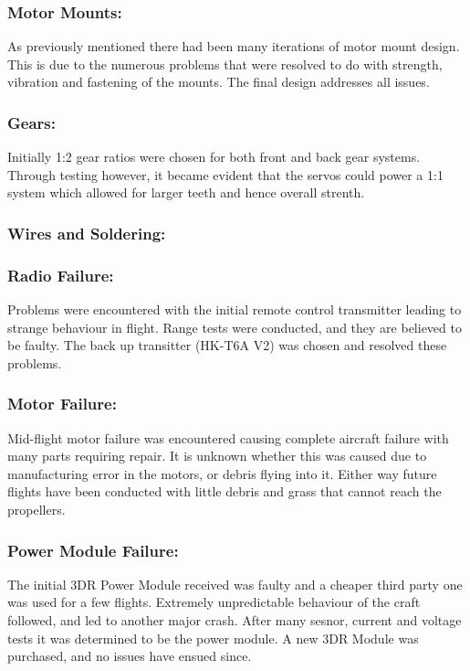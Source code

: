 \subsubsection*{Motor Mounts:} As previously mentioned there had been many iterations of motor mount design. This is due to the numerous problems that were resolved to do with strength, vibration and fastening of the mounts. The final design addresses all issues.
\subsubsection*{Gears:} Initially 1:2 gear ratios were chosen for both front and back gear systems. Through testing however, it became evident that the servos could power a 1:1 system which allowed for larger teeth and hence overall strenth.
\subsubsection*{Wires and Soldering:}  
\subsubsection*{Radio Failure:} Problems were encountered with the initial remote control  transmitter leading to strange behaviour in flight. Range tests were conducted, and they are believed to be faulty. The back up transitter (HK-T6A V2) was chosen and resolved these problems.
\subsubsection*{Motor Failure:} Mid-flight motor failure was encountered causing complete aircraft failure with many parts requiring repair. It is unknown whether this was caused due to manufacturing error in the motors, or debris flying into it. Either way future flights have been conducted with little debris and grass that cannot reach the propellers. 
\subsubsection*{Power Module Failure:}  The initial 3DR Power Module received was faulty and a cheaper third party one was used for a few flights. Extremely unpredictable behaviour of the craft followed, and led to another major crash. After many sesnor, current and voltage tests it was determined to be the power module. A new 3DR Module was purchased, and no issues have ensued since.  
